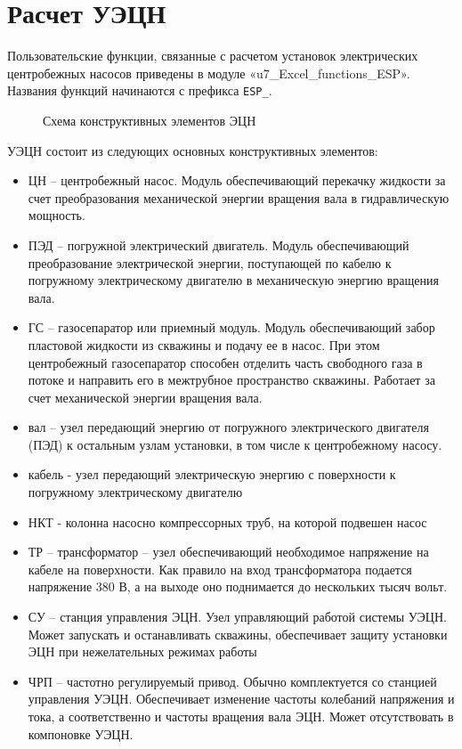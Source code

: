 \section{Расчет УЭЦН}
Пользовательские функции, связанные с расчетом установок электрических центробежных насосов приведены в модуле «u7\_Excel\_functions\_ESP».  Названия функций начинаются с префикса \texttt{ESP_}. 

\begin{figure}[H]
	\begin{center}
		
		\caption{Схема конструктивных элементов ЭЦН}
		\label{ris:ESP_well_1}
	\end{center}
\end{figure}

УЭЦН состоит из следующих основных конструктивных элементов:
\begin{itemize}
	\item ЦН -- центробежный насос. Модуль обеспечивающий перекачку жидкости за счет преобразования механической энергии вращения вала в гидравлическую мощность. 
	\item ПЭД -- погружной электрический двигатель. Модуль обеспечивающий преобразование электрической энергии, поступающей по кабелю к погружному электрическому двигателю в механическую энергию вращения вала.
	\item ГС -- газосепаратор или приемный модуль. Модуль обеспечивающий забор пластовой жидкости из скважины и подачу ее в насос. При этом центробежный газосепаратор способен отделить часть свободного газа в потоке и направить его в межтрубное пространство скважины. Работает за счет механической энергии вращения вала.
	\item вал -- узел передающий энергию от погружного электрического двигателя (ПЭД) к остальным узлам установки, в том числе к центробежному насосу.
	\item кабель - узел передающий электрическую энергию с поверхности к погружному электрическому двигателю
	\item НКТ - колонна насосно компрессорных труб, на которой подвешен насос
	\item ТР -- трансформатор -- узел обеспечивающий необходимое напряжение на кабеле на поверхности. Как правило на вход трансформатора подается напряжение 380 В, а на выходе оно поднимается до нескольких тысяч вольт. 
	\item СУ -- станция управления ЭЦН. Узел управляющий работой системы УЭЦН. Может запускать и  останавливать скважины, обеспечивает защиту установки ЭЦН при нежелательных режимах работы
	\item ЧРП -- частотно регулируемый привод. Обычно комплектуется со станцией управления УЭЦН. Обеспечивает изменение частоты колебаний напряжения и тока, а соответственно и частоты вращения вала ЭЦН. Может отсутствовать в компоновке УЭЦН. 
\end{itemize}

